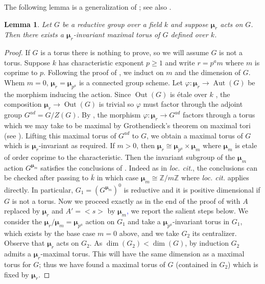 \documentclass{amsart}
\newtheorem{lemma}[lemma]{Lemma}
\theoremstyle{definition}
\newcommand{\bZ}{\mathbb{Z}}
\newcommand{\bmu}{\pmb{\mu}}
\DeclareMathOperator{\Out}{Out}
\DeclareMathOperator{\Aut}{Aut}
\begin{document}
The following lemma is a generalization of \cite[Theorem 3$''$]{serre2010bounds}; see also \cite[Lemma 2.7]{gille2024loop}. 

\begin{lemma}\label{lemma_there_is_a_bmu_point}
Let $G$ be a reductive group over a field $k$ and suppose $\bmu_r$ acts on $G$. Then there exists a $\bmu_r$-invariant maximal torus of $G$ defined over $k$. 
\end{lemma}

\begin{proof} If $G$ is a torus there is nothing to prove, so we will assume $G$ is not a torus. Suppose $k$ has characteristic exponent $p \geq 1$ and write $r = p^am$ where $m$ is coprime to $p$. Following the proof of \cite[Theorem $3''$]{serre2010bounds}, we induct on $m$ and the dimension of $G$. Whem $m = 0$, $\bmu_r = \bmu_{p^a}$ is a connected group scheme. Let $\varphi : \bmu_r \to \Aut(G)$ be the morphism inducing the action. Since $\Out(G)$ is \'etale over $k$ \cite[Theorem 7.1.9(1)]{ConradReductive}, the composition $\bmu_r \to \Out(G)$ is trivial so $\varphi$ must factor through the adjoint group $G^{ad} = G/Z(G)$. By \cite[Lemma 7.1]{martens2015}, the morphism $\varphi : \bmu_r \to G^{ad}$ factors through a torus which we may take to be maximal by Grothendieck's theorem on maximal tori (see \cite[Remark A.1.2]{ConradReductive}). Lifting this maximal torus of $G^{ad}$ to $G$, we obtain a maximal torus of $G$ which is $\bmu_r$-invariant as required. If $m > 0$, then $\bmu_r \cong \bmu_{p^a} \times \bmu_m$ where $\bmu_m$ is etale of order coprime to the characteristic.
Then the invariant subgroup of the $\bmu_m$ action $G^{\bmu_m}$ satisfies the conclusions of \cite[Proposition 3]{serre2010bounds}. Indeed as in \emph{loc. cit.}, the conclusions can be checked after passing to $\bar{k}$ in which case $\bmu_m \cong \bZ/m\bZ$ where \emph{loc. cit.} applies directly. In particular, $G_1 = (G^{\bmu_m})^0$ is reductive and it is positive dimensional if $G$ is not a torus.
Now we proceed exactly as in the end of the proof of \cite[Theorem $3''$]{serre2010bounds} with $A$ replaced by $\bmu_r$ and $A' = <s>$ by $\bmu_m$\textcolor{blue}, we report the salient steps below. We consider the $\bmu_r/\bmu_m = \bmu_{p^a}$ action on $G_1$ and take a $\bmu_{p^a}$-invariant torus in $G_1$, which exists by the base case $m = 0$ above, and we take $G_2$ its centralizer. Observe that $\bmu_r$ acts on $G_2$. As $\dim(G_2)<\dim(G)$, by induction $G_2$ admits a $\bmu_r$-maximal torus. This will have the same dimension as a maximal torus for $G$; thus we have found a maximal torus of $G$ (contained in $G_2$) which is fixed by $\bmu_r$. 
\end{proof} 
\end{document}
